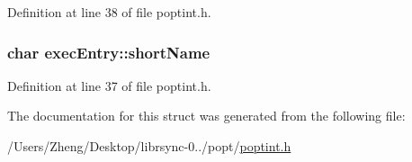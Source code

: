 Definition at line 38 of file poptint.\+h.

\hypertarget{structexec_entry_af6c333959b21ca21072a9d8fb8de251c}{}
\subsubsection[{short\+Name}]{\setlength{\rightskip}{0pt plus 5cm}char exec\+Entry\+::short\+Name}\label{structexec_entry_af6c333959b21ca21072a9d8fb8de251c}


Definition at line 37 of file poptint.\+h.



The documentation for this struct was generated from the following file\+:\begin{DoxyCompactItemize}
\item 
/\+Users/\+Zheng/\+Desktop/librsync-\/0../popt/\hyperlink{poptint_8h}{poptint.\+h}\end{DoxyCompactItemize}
